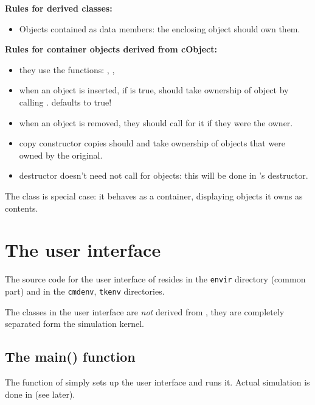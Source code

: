 \textbf{Rules for derived classes:}
\begin{itemize}
  \item{Objects contained as data members: the enclosing object should
    own them.}
\end{itemize}

\textbf{Rules for container objects derived from cObject:}
\begin{itemize}
  \item{they use the functions: ,
    , }
  \item{when an object is inserted, if  is
    true, should take ownership of object by calling
    .  defaults to
    true!}
  \item{when an object is removed, they should call
     for it if they were the owner.}
  \item{copy constructor copies should  and take
    ownership of objects that were owned by the original.}
  \item{destructor doesn't need not call  for objects:
    this will be done in 's destructor.}
\end{itemize}

The class  is special case: it behaves as a container,
displaying objects it owns as contents.




\section{The user interface}

The source code for the user interface of {\opp} resides in the
\texttt{envir} directory (common part) and in the \texttt{cmdenv},
\texttt{tkenv} directories.

The classes in the user interface are \textit{not} derived from , 
they are completely separated form the simulation kernel.





\subsection{The main() function}

The  function of {\opp} simply sets up the user
interface and runs it. Actual simulation is done in
 (see later).





